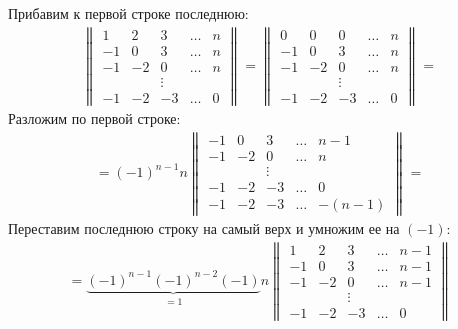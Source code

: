 \begin{solution}
    Прибавим к первой строке последнюю:
    \begin{eqnarray}
        \begin{Vmatrix}
             1 &  2 &  3 & \ldots & n \\
            -1 &  0 &  3 & \ldots & n \\
            -1 & -2 &  0 & \ldots & n \\
               &    & \vdots &    &   \\
            -1 & -2 & -3 & \ldots & 0
        \end{Vmatrix} = 
        \begin{Vmatrix}
            0 &  0 &  0 & \ldots & n \\
            -1 &  0 &  3 & \ldots & n \\
            -1 & -2 &  0 & \ldots & n \\
               &    & \vdots & &   \\
            -1 & -2 & -3 & \ldots & 0
        \end{Vmatrix} = 
    \end{eqnarray}
    Разложим по первой строке:
    \begin{eqnarray}
        = (-1)^{n-1}n
        \begin{Vmatrix}
            -1 &  0 &  3 & \ldots & n-1 \\
            -1 & -2 &  0 & \ldots & n   \\
               &    & \vdots & &       \\
            -1 & -2 & -3 & \ldots & 0 \\
            -1 & -2 & -3 & \ldots & -(n-1)
        \end{Vmatrix} =
    \end{eqnarray}
    Переставим последнюю строку на самый верх и умножим ее на $(-1)$:
    \begin{eqnarray}
        = \underbrace{(-1)^{n-1}(-1)^{n-2}(-1)}_{=1}n
        \begin{Vmatrix}
            1 &  2 &  3 & \ldots & n-1 \\
            -1 &  0 &  3 & \ldots & n-1 \\
            -1 & -2 &  0 & \ldots & n-1 \\
               &    & \vdots &    &   \\
            -1 & -2 & -3 & \ldots & 0
        \end{Vmatrix}
    \end{eqnarray}

\end{solution}
